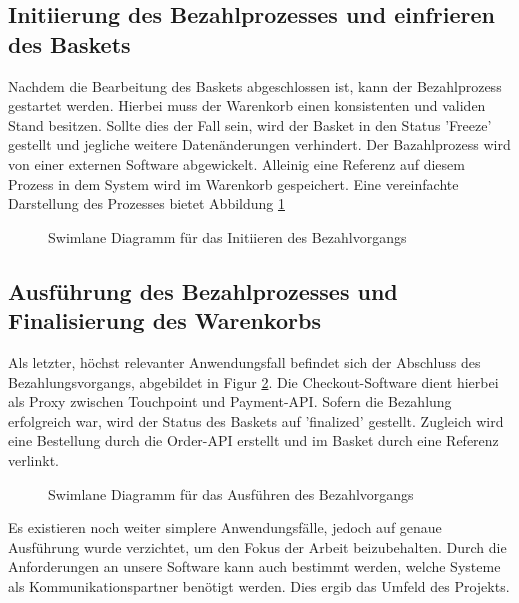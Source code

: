 \subsection{Initiierung des Bezahlprozesses und einfrieren des Baskets}

Nachdem die Bearbeitung des Baskets abgeschlossen ist, kann der Bezahlprozess gestartet werden. Hierbei muss der Warenkorb einen konsistenten und validen Stand besitzen. Sollte dies der Fall sein, wird der Basket in den Status 'Freeze' gestellt und jegliche weitere Datenänderungen verhindert. Der Bazahlprozess wird von einer externen Software abgewickelt. Alleinig eine Referenz auf diesem Prozess in dem System wird im Warenkorb gespeichert. Eine vereinfachte Darstellung des Prozesses bietet Abbildung \ref{fig:SL-InitPayment}

\begin{figure}[htbp]
	\centering
	
	\caption{Swimlane Diagramm für das Initiieren des Bezahlvorgangs }
	\label{fig:SL-InitPayment}
\end{figure}

\subsection{Ausführung des Bezahlprozesses und Finalisierung des Warenkorbs}

Als letzter, höchst relevanter Anwendungsfall befindet sich der Abschluss des Bezahlungsvorgangs, abgebildet in Figur \ref{fig:SL-ExecPayment}. Die Checkout-Software dient hierbei als Proxy zwischen Touchpoint und Payment-API. Sofern die Bezahlung erfolgreich war, wird der Status des Baskets auf 'finalized' gestellt. Zugleich wird eine Bestellung durch die Order-API erstellt und im Basket durch eine Referenz verlinkt.

\begin{figure}[htbp]
	\centering
	
	\caption{Swimlane Diagramm für das Ausführen des Bezahlvorgangs }
	\label{fig:SL-ExecPayment}
\end{figure}

Es existieren noch weiter simplere Anwendungsfälle, jedoch auf genaue Ausführung wurde verzichtet, um den Fokus der Arbeit beizubehalten. Durch die Anforderungen an unsere Software kann auch bestimmt werden, welche Systeme als Kommunikationspartner benötigt werden. Dies ergib das Umfeld des Projekts. 

